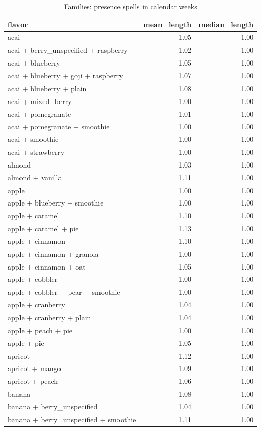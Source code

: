 \begin{table}
\caption{Families: presence spells in calendar weeks}
\begin{tabular}{lrr}
\toprule
flavor & mean\_length & median\_length \\
\midrule
acai & 1.05 & 1.00 \\
acai + berry\_unspecified + raspberry & 1.02 & 1.00 \\
acai + blueberry & 1.05 & 1.00 \\
acai + blueberry + goji + raspberry & 1.07 & 1.00 \\
acai + blueberry + plain & 1.08 & 1.00 \\
acai + mixed\_berry & 1.00 & 1.00 \\
acai + pomegranate & 1.01 & 1.00 \\
acai + pomegranate + smoothie & 1.00 & 1.00 \\
acai + smoothie & 1.00 & 1.00 \\
acai + strawberry & 1.00 & 1.00 \\
almond & 1.03 & 1.00 \\
almond + vanilla & 1.11 & 1.00 \\
apple & 1.00 & 1.00 \\
apple + blueberry + smoothie & 1.00 & 1.00 \\
apple + caramel & 1.10 & 1.00 \\
apple + caramel + pie & 1.13 & 1.00 \\
apple + cinnamon & 1.10 & 1.00 \\
apple + cinnamon + granola & 1.00 & 1.00 \\
apple + cinnamon + oat & 1.05 & 1.00 \\
apple + cobbler & 1.00 & 1.00 \\
apple + cobbler + pear + smoothie & 1.00 & 1.00 \\
apple + cranberry & 1.04 & 1.00 \\
apple + cranberry + plain & 1.04 & 1.00 \\
apple + peach + pie & 1.00 & 1.00 \\
apple + pie & 1.05 & 1.00 \\
apricot & 1.12 & 1.00 \\
apricot + mango & 1.09 & 1.00 \\
apricot + peach & 1.06 & 1.00 \\
banana & 1.08 & 1.00 \\
banana + berry\_unspecified & 1.04 & 1.00 \\
banana + berry\_unspecified + smoothie & 1.11 & 1.00 \\

\end{tabular}
\end{table}
